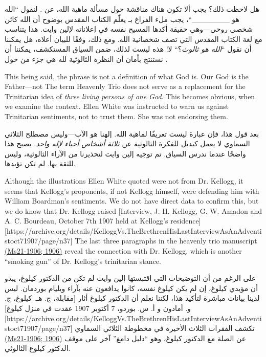 هل لاحظت ذلك؟ يجب ألا تكون هناك مناقشة حول مسألة ماهية الله،  عن . لنقول “الله هو \_\_\_\_\_\_\_“، يجب ملء الفراغ بـ  يعلّم الكتاب المقدس بوضوح أن الله كائن شخصي روحي—وهي حقيقة أكدها المسيح نفسه في إعلاناته لإلين وايت. هذا يتناسب مع لغة الكتاب المقدس التي تصف شخصانية الله. ومع ذلك، وفقًا للبيان أعلاه، هل يمكننا أن نقول “\textit{الله هو ثالوث}؟“ لا! هذه ليست  لذلك، ضمن السياق المستكشف، يمكننا أن نستنتج بأمان أن النظرة الثالوثية لله هي جزء من  حول .


This being said, the phrase  is not a definition of what God is. Our God is the Father—not  The term Heavenly Trio does not serve as a replacement for the Trinitarian idea of \textit{three living persons of one God}. This becomes obvious, when we examine the context. Ellen White was instructed to warn us against Trinitarian sentiments, not to trust them. She was not endorsing them.


بعد قول هذا، فإن عبارة  ليست تعريفًا لماهية الله. إلهنا هو الآب—وليس  مصطلح الثلاثي السماوي لا يعمل كبديل للفكرة الثالوثية عن \textit{ثلاثة أشخاص أحياء لإله واحد}. يصبح هذا واضحًا عندما ندرس السياق. تم توجيه إلين وايت لتحذيرنا من الآراء الثالوثية، وليس للثقة بها. لم تكن تؤيدها.


Although the illustrations Ellen White quoted were not from Dr. Kellogg, it seems that Kellogg's proponents, if not Kellogg himself, were defending him with William Boardman's sentiments. We do not have direct data to confirm this, but we do know that Dr. Kellogg raised [Interview, J. H. Kellogg, G. W. Amadon and A. C. Bourdeau, October 7th 1907 held at Kellogg’s residence][https://archive.org/details/KelloggVs.TheBrethrenHisLastInterviewAsAnAdventistoct71907/page/n37] The last three paragraphs in the heavenly trio manuscript \href{https://egwwritings.org/?ref=en_Ms21-1906&para=9754.1}{(Ms21-1906; 1906)} reveal the connection with Dr. Kellogg, which is another “smoking gun” of Dr. Kellogg's trinitarian stance.


على الرغم من أن التوضيحات التي اقتبستها إلين وايت لم تكن من الدكتور كيلوغ، يبدو أن مؤيدي كيلوغ، إن لم يكن كيلوغ نفسه، كانوا يدافعون عنه بآراء ويليام بوردمان. ليس لدينا بيانات مباشرة لتأكيد هذا، لكننا نعلم أن الدكتور كيلوغ أثار [مقابلة، ج. هـ. كيلوغ، ج. و. أمادون و أ. س. بوردو، 7 أكتوبر 1907 عقدت في منزل كيلوغ][https://archive.org/details/KelloggVs.TheBrethrenHisLastInterviewAsAnAdventistoct71907/page/n37] تكشف الفقرات الثلاث الأخيرة في مخطوطة الثلاثي السماوي \href{https://egwwritings.org/?ref=en_Ms21-1906&para=9754.1}{(Ms21-1906; 1906)} عن الصلة مع الدكتور كيلوغ، وهو “دليل دامغ” آخر على موقف الدكتور كيلوغ الثالوثي.


